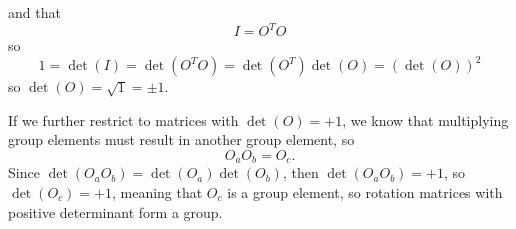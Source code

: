 \documentclass[a4paper,twoside]{article}
\begin{document}
\begin{itemize}
\begin{problem}
            and that
            \begin{equation}
                I = O^T O
            \end{equation}
            so
            \begin{equation}
                1 = \det(I) = \det(O^T O) = \det(O^T)\det(O) = \left( \det(O) \right)^2
            \end{equation}
            so $ \det(O) = \sqrt{1} = \pm 1 $.
        \end{problem}
        \begin{problem}
            If we further restrict to matrices with $ \det(O) = +1 $, we know that multiplying group elements must result in another group element, so
            \begin{equation}
                O_a O_b = O_c.
            \end{equation}
            Since $ \det(O_a O_b) = \det(O_a)\det(O_b) $, then $ \det(O_a O_b) = +1 $, so $ \det(O_c) = +1 $, meaning that $ O_c $ is a group element, so rotation matrices with positive determinant form a group.
        \end{problem}


\end{itemize}
\end{document}
